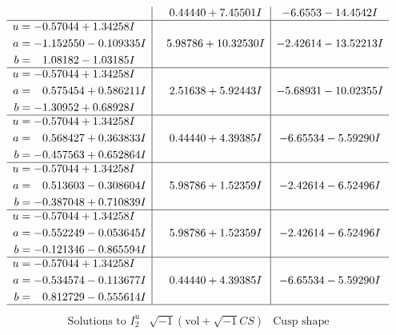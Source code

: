 \documentclass[1p]{elsarticle_modified}
\theoremstyle{definition}
\newcommand{\I}{\sqrt{-1}}
\begin{document}
$$\begin{array}{c|c|c}
 & \phantom{-}0.44440 + 7.45501 I & -6.6553 - 14.4542 I \\ \hline\begin{aligned}
u &= -0.57044 + 1.34258 I \\
a &= -1.152550 - 0.109335 I \\
b &= \phantom{-}1.08182 - 1.03185 I\end{aligned}
 & \phantom{-}5.98786 + 10.32530 I & -2.42614 - 13.52213 I \\ \hline\begin{aligned}
u &= -0.57044 + 1.34258 I \\
a &= \phantom{-}0.575454 + 0.586211 I \\
b &= -1.30952 + 0.68928 I\end{aligned}
 & \phantom{-}2.51638 + 5.92443 I & -5.68931 - 10.02355 I \\ \hline\begin{aligned}
u &= -0.57044 + 1.34258 I \\
a &= \phantom{-}0.568427 + 0.363833 I \\
b &= -0.457563 + 0.652864 I\end{aligned}
 & \phantom{-}0.44440 + 4.39385 I & -6.65534 - 5.59290 I \\ \hline\begin{aligned}
u &= -0.57044 + 1.34258 I \\
a &= \phantom{-}0.513603 - 0.308604 I \\
b &= -0.387048 + 0.710839 I\end{aligned}
 & \phantom{-}5.98786 + 1.52359 I & -2.42614 - 6.52496 I \\ \hline\begin{aligned}
u &= -0.57044 + 1.34258 I \\
a &= -0.552249 - 0.053645 I \\
b &= -0.121346 - 0.865594 I\end{aligned}
 & \phantom{-}5.98786 + 1.52359 I & -2.42614 - 6.52496 I \\ \hline\begin{aligned}
u &= -0.57044 + 1.34258 I \\
a &= -0.534574 - 0.113677 I \\
b &= \phantom{-}0.812729 - 0.555614 I\end{aligned}
 & \phantom{-}0.44440 + 4.39385 I & -6.65534 - 5.59290 I\\
 \hline 
 \end{array}$$\newpage$$\begin{array}{c|c|c}  
\text{Solutions to }I^u_{2}& \I (\text{vol} + \sqrt{-1}CS) & \text{Cusp shape}\\

\end{array}$$
\end{document}
